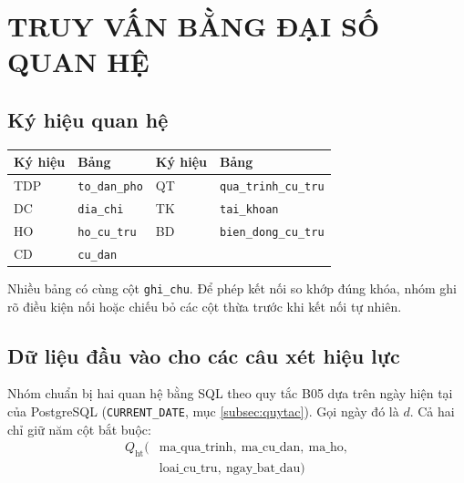 \section{TRUY VẤN BẰNG ĐẠI SỐ QUAN HỆ}
\label{sec:chuong4}

\begingroup
\setlength{\parskip}{4pt}
\setlength{\jot}{5pt}
\newenvironment{racau}[2]{%
    \par\addvspace{.85\baselineskip}%
    \noindent\begin{minipage}{\linewidth}
    \subsection*{Câu #1. #2}
}{%
    \end{minipage}\par
}

\subsection*{Ký hiệu quan hệ}

\begingroup
\renewcommand{\arraystretch}{1.16}
\noindent\begin{tabularx}{\linewidth}{@{}lYlY@{}}
\hline
{}
\textbf{Ký hiệu} & \textbf{Bảng} & \textbf{Ký hiệu} & \textbf{Bảng} \\
\hline
TDP & \texttt{to\_dan\_pho} & QT & \texttt{qua\_trinh\_cu\_tru} \\
DC  & \texttt{dia\_chi}     & TK & \texttt{tai\_khoan} \\
HO  & \texttt{ho\_cu\_tru}  & BD & \texttt{bien\_dong\_cu\_tru} \\
CD  & \texttt{cu\_dan}     &    & \\
\hline
\end{tabularx}
\endgroup

Nhiều bảng có cùng cột \texttt{ghi\_chu}. Để phép kết nối so khớp đúng khóa, nhóm ghi rõ điều kiện nối hoặc chiếu bỏ các cột thừa trước khi kết nối tự nhiên.

\subsection*{Dữ liệu đầu vào cho các câu xét hiệu lực}
\label{subsec:qd}

Nhóm chuẩn bị hai quan hệ bằng SQL theo quy tắc B05 dựa trên ngày hiện tại của PostgreSQL (\texttt{CURRENT\_DATE}, mục \ref{subsec:quytac}). Gọi ngày đó là $d$. Cả hai chỉ giữ năm cột bắt buộc:
\begin{equation*}
\begin{aligned}
Q_{\mathrm{ht}}(&\text{ma\_qua\_trinh},\ \text{ma\_cu\_dan},\ \text{ma\_ho},\\
    &\text{loai\_cu\_tru},\ \text{ngay\_bat\_dau})
\end{aligned}
\end{equation*}

